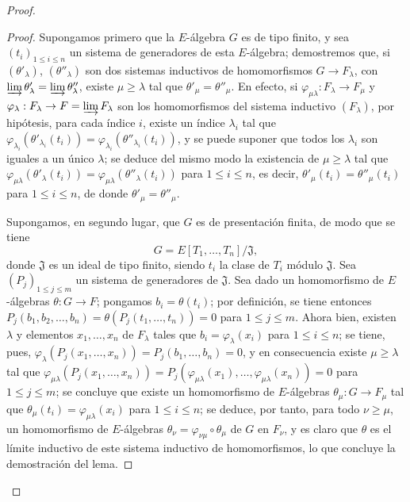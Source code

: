\begin{proof}
\begin{proof}
Supongamos primero que la $E$-álgebra $G$ es de tipo finito, y sea $(t_i)_{1\leqslant i\leqslant n}$ un sistema de generadores de esta $E$-álgebra; demostremos que, si $(\theta'_\lambda)$, $(\theta''_\lambda)$ son dos sistemas inductivos de homomorfismos $G\to F_\lambda$, con $\varinjlim\theta'_\lambda=\varinjlim\theta''_\lambda$, existe $\mu\geqslant\lambda$ tal que $\theta'_\mu=\theta''_\mu$.
En efecto, si $\varphi_{\mu\lambda}:F_\lambda\to F_\mu$ y $\varphi_\lambda:F_\lambda\to F=\varinjlim F_\lambda$ son los homomorfismos del sistema inductivo $(F_\lambda)$, por hipótesis, para cada índice $i$, existe un índice $\lambda_i$ tal que $\varphi_{\lambda_i}(\theta'_{\lambda_i}(t_i))=\varphi_{\lambda_i}(\theta''_{\lambda_i}(t_i))$, y se puede suponer que todos los $\lambda_i$ son iguales a un único $\lambda$; se deduce del mismo modo la existencia de $\mu\geqslant\lambda$ tal que $\varphi_{\mu\lambda}(\theta'_\lambda(t_i))=\varphi_{\mu\lambda}(\theta''_\lambda(t_i))$ para $1\leqslant i\leqslant n$, es decir, $\theta'_\mu(t_i)=\theta''_\mu(t_i)$ para $1\leqslant i\leqslant n$, de donde $\theta'_\mu=\theta''_\mu$.

Supongamos, en segundo lugar, que $G$ es de presentación finita, de modo que se tiene
\[
  G=E[T_1,\ldots,T_n]/\mathfrak{J},
\]
donde $\mathfrak{J}$ es un ideal de tipo finito, siendo $t_i$ la clase de $T_i$ módulo $\mathfrak{J}$.
Sea $(P_j)_{1\leqslant j\leqslant m}$ un sistema de generadores de $\mathfrak{J}$.
Sea dado un homomorfismo de $E$-álgebras $\theta:G\to F$; pongamos $b_i=\theta(t_i)$; por definición, se tiene entonces $P_j(b_1,b_2,\ldots,b_n)=\theta(P_j(t_1,\ldots,t_n))=0$ para $1\leqslant j\leqslant m$.
Ahora bien, existen $\lambda$ y elementos $x_1,\ldots,x_n$ de $F_\lambda$ tales que $b_i=\varphi_\lambda(x_i)$ para $1\leqslant i\leqslant n$; se tiene, pues, $\varphi_\lambda(P_j(x_1,\ldots,x_n))=P_j(b_1,\ldots,b_n)=0$, y en consecuencia existe $\mu\geqslant\lambda$ tal que $\varphi_{\mu\lambda}(P_j(x_1,\ldots,x_n))=P_j(\varphi_{\mu\lambda}(x_1),\ldots,\varphi_{\mu\lambda}(x_n))=0$ para $1\leqslant j\leqslant m$; se concluye que existe un homomorfismo de $E$-álgebras $\theta_\mu:G\to F_\mu$ tal que $\theta_\mu(t_i)=\varphi_{\mu\lambda}(x_i)$
para $1\leqslant i\leqslant n$; se deduce, por tanto, para todo $\nu\geqslant\mu$, un homomorfismo de $E$-álgebras $\theta_\nu=\varphi_{\nu\mu}\circ\theta_\mu$ de $G$ en $F_\nu$, y es claro que $\theta$ es el límite inductivo de este sistema inductivo de homomorfismos, lo que concluye la demostración del lema.
\end{proof}


\end{proof}

